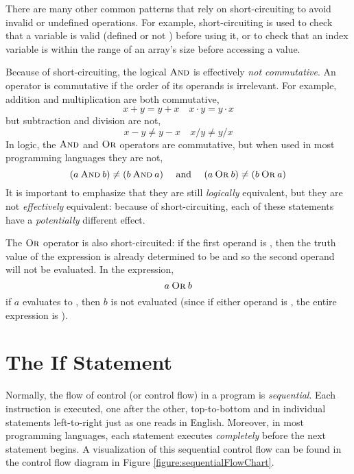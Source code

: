 There are many other common patterns that rely on short-circuiting to 
avoid invalid or undefined operations.  For example, short-circuiting is 
used to check that a variable is valid (defined or not \Null) before
using it, or to check that an index variable is within the 
range of an array's size before accessing a value.  

Because of short-circuiting, the logical $\mathbin{\textsc{And}}$ is effectively \emph{not commutative}.
An operator is commutative if the order of its operands is irrelevant.  For example, 
addition and multiplication are both commutative, 
  $$x + y = y + x \quad x \cdot y = y \cdot x$$
but subtraction and division are not, 
  $$x - y \neq y - x \quad x / y \neq y / x$$
In logic, the $\mathbin{\textsc{And}}$ and $\mathbin{\textsc{Or}}$ operators are commutative, but when used in most
programming languages they are not, 
  $$(a \mathbin{\textsc{And}} b) \neq (b \mathbin{\textsc{And}} a) \quad \textrm{ and } \quad (a \mathbin{\textsc{Or}} b) \neq (b \mathbin{\textsc{Or}} a)$$
It is important to emphasize that they are still \emph{logically} equivalent, but they
are not \emph{effectively} equivalent: because of short-circuiting, each of these
statements have a \emph{potentially} different effect.

The $\mathbin{\textsc{Or}}$ operator is also short-circuited: if the first operand is \True, then the 
truth value of the expression is already determined to be \True and so the second
operand will not be evaluated.  In the expression, 
  $$a \mathbin{\textsc{Or}} b$$
if $a$ evaluates to \True, then $b$ is not evaluated (since if either operand is \True, 
the entire expression is \True).

\section{The If Statement}

Normally, the flow of control (or \gls{control flow}) in a program is \emph{sequential}.  
Each instruction is executed, one after the other, top-to-bottom and in individual
statements left-to-right just as one reads in English.  Moreover, in most programming 
languages, each statement executes \emph{completely} before the next statement
begins.  A visualization of this sequential control flow can be found in the control
flow diagram in Figure \ref{figure:sequentialFlowChart}.


